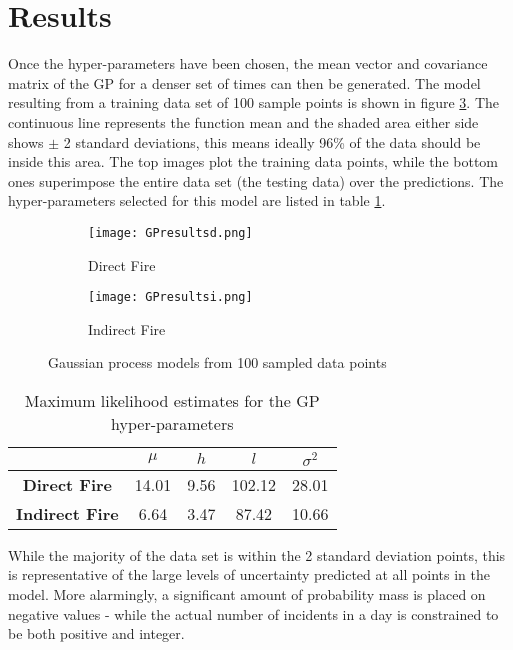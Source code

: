 \documentclass[a4paper,11pt]{report}
\begin{document}
\section{Results}

Once the hyper-parameters have been chosen, the mean vector and covariance matrix of the GP for a denser set of times can then be generated. The model resulting from a training data set of 100 sample points is shown in figure \ref{fig:GPresults}. The continuous line represents the function mean and the shaded area either side shows \(\pm\) 2 standard deviations, this means ideally 96\% of the data should be inside this area. The top images plot the training data points, while the bottom ones superimpose the entire data set (the testing data) over the predictions. The hyper-parameters selected for this model are listed in table \ref{GPhyperparameters}.

\begin{figure}
\centering
\begin{subfigure}{.5\textwidth}
	\centering
	\texttt{[image: GPresultsd.png]}
  	\caption{Direct Fire}
  	\label{fig:sub1}
\end{subfigure}%
\begin{subfigure}{.5\textwidth}
  	\centering
  	\texttt{[image: GPresultsi.png]}
  	\caption{Indirect Fire}
 	 \label{fig:sub2}
\end{subfigure}
\caption{Gaussian process models from 100 sampled data points}
\label{fig:GPresults}
\end{figure}

\singlespacing
\begin{table}[]
\centering
\caption{Maximum likelihood estimates for the GP hyper-parameters}
\label{GPhyperparameters}
\begin{tabular}{c|c|c|c|c|}
\cline{2-5}
\textbf{}                                    & \(\mu\) & \(h\) & \(l\) & \(\sigma^2\) \\ \hline
\multicolumn{1}{|c|}{\textbf{Direct Fire}}   & 14.01           & 9.56          & 102.12          & 28.01              \\ \hline
\multicolumn{1}{|c|}{\textbf{Indirect Fire}} & 6.64           & 3.47          & 87.42          & 10.66              \\ \hline
\end{tabular}
\end{table}
\doublespacing

While the majority of the data set is within the 2 standard deviation points, this is representative of the large levels of uncertainty predicted at all points in the model. More alarmingly, a significant amount of probability mass is placed on negative values - while the actual number of incidents in a day is constrained to be both positive and integer. \par 
\end{document}
